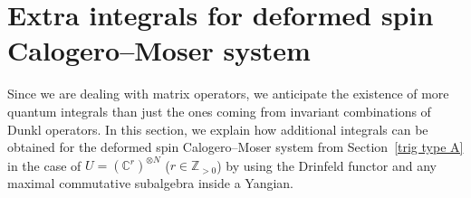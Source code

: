 \documentclass[12pt]{amsart}
\newcommand{\Z}{\mathbb Z}
\numberwithin{equation}{section}
\theoremstyle{definition}
\begin{document}


\section{Extra integrals for deformed spin Calogero--Moser system}\label{extra integals}
Since we are dealing with matrix operators, we anticipate the existence of more quantum integrals than just the ones coming from invariant combinations of Dunkl operators. In this section, we explain how additional integrals %
can be obtained for the deformed spin Calogero--Moser system from Section~\ref{trig type A} in the case of $U = (\mathbb{C}^r)^{\otimes N}$ ($r \in \Z_{>0}$) by using
the Drinfeld functor and any maximal commutative subalgebra inside a Yangian.
\end{document}
